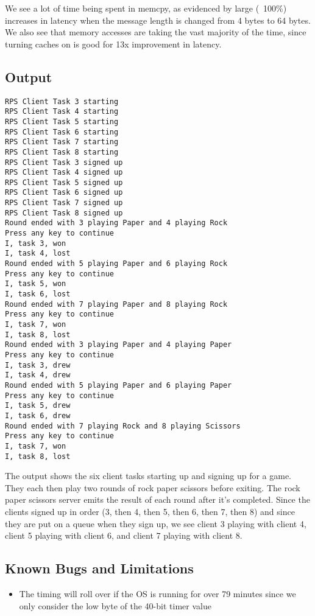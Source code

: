 \documentclass{article}
\begin{document}
We see a lot of time being spent in memcpy, as evidenced by large (~100\%) increases in latency when the message length is changed from 4 bytes to 64 bytes. We also see that memory accesses are taking the vast majority of the time, since turning caches on is good for 13x improvement in latency.

\subsection{Output}
\begin{verbatim}
RPS Client Task 3 starting
RPS Client Task 4 starting
RPS Client Task 5 starting
RPS Client Task 6 starting
RPS Client Task 7 starting
RPS Client Task 8 starting
RPS Client Task 3 signed up
RPS Client Task 4 signed up
RPS Client Task 5 signed up
RPS Client Task 6 signed up
RPS Client Task 7 signed up
RPS Client Task 8 signed up
Round ended with 3 playing Paper and 4 playing Rock
Press any key to continue 
I, task 3, won
I, task 4, lost
Round ended with 5 playing Paper and 6 playing Rock
Press any key to continue 
I, task 5, won
I, task 6, lost
Round ended with 7 playing Paper and 8 playing Rock
Press any key to continue 
I, task 7, won
I, task 8, lost
Round ended with 3 playing Paper and 4 playing Paper
Press any key to continue 
I, task 3, drew
I, task 4, drew
Round ended with 5 playing Paper and 6 playing Paper
Press any key to continue 
I, task 5, drew
I, task 6, drew
Round ended with 7 playing Rock and 8 playing Scissors
Press any key to continue 
I, task 7, won
I, task 8, lost
\end{verbatim}

The output shows the six client tasks starting up and signing up for a game. They each then play two rounds of rock paper scissors before exiting. The rock paper scissors server emits the result of each round after it's completed. Since the clients signed up in order (3, then 4, then 5, then 6, then 7, then 8) and since they are put on a queue when they sign up, we see client 3 playing with client 4, client 5 playing with client 6, and client 7 playing with client 8.

\subsection{Known Bugs and Limitations}
\begin{itemize}
    \item The timing will roll over if the OS is running for over 79 minutes since we only consider the low byte of the 40-bit timer value
\end{itemize}
\end{document}
